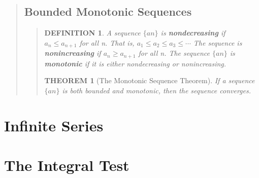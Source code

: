 \documentclass{report}
\newtheorem{theorem}{THEOREM}
\newtheorem*{definition}{DEFINITION}
\begin{document}
\begin{quote}
\begin{quote}
	\end{quote}

	\subsection{Bounded Monotonic Sequences}
	\begin{quote}

		\begin{definition}
			A sequence $\{an\}$ is \textbf{nondecreasing} if $a_n \leq a_{n+1}$ for all n. That is, $a_1 \leq a_2 \leq a_3 \leq \cdots$ The sequence is \textbf{nonincreasing} if $a_n \geq a_{n+1}$ for all n. The sequence $\{an\}$ is \textbf{monotonic} if it is either nondecreasing or nonincreasing.
		\end{definition}

		
		\begin{theorem}[The Monotonic Sequence Theorem]
			\mbox{}\par
			If a sequence $\{an\}$ is both bounded and monotonic, then the sequence converges. 
		\end{theorem}
		
	
	\end{quote}

\end{quote}


\section{Infinite Series }
\begin{quote}

\end{quote}


\section{The Integral Test }
\begin{quote}

\end{quote}

\end{document}

